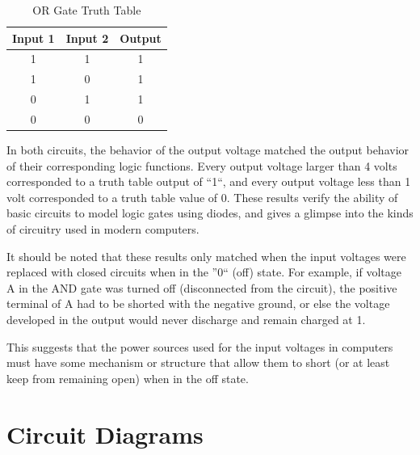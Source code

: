 \documentclass[twocolumn,english]{IEEEtran}
\begin{document}
\begin{table}[h]
\centering{}
\caption{OR Gate Truth Table}
\begin{tabular}{@{}ccc@{}}
\toprule
\textbf{Input 1} & \multicolumn{1}{l}{\textbf{Input 2}} & \multicolumn{1}{l}{\textbf{Output}} \\ \midrule
1                & 1                                    & 1                                   \\
1                & 0                                    & 1                                   \\
0                & 1                                    & 1                                   \\
0                & 0                                    & 0                                   \\ \bottomrule
\end{tabular}
\end{table}

In both circuits, the behavior of the output voltage matched the output behavior of their corresponding logic functions.
Every output voltage larger than 4 volts corresponded to a truth table output of ``1``, and every output voltage less than 1 volt corresponded to a truth table value of 0.
These results verify the ability of basic circuits to model logic gates using diodes, and gives a glimpse into the kinds of circuitry used in modern computers.

It should be noted that these results only matched when the input voltages were replaced with closed circuits when in the ''0`` (off) state.
For example, if voltage A in the AND gate was turned off (disconnected from the circuit), the positive terminal of A had to be shorted with the negative ground, or else the voltage developed in the output would never discharge and remain charged at 1.

This suggests that the power sources used for the input voltages in computers must have some mechanism or structure that allow them to short (or at least keep from remaining open) when in the off state.

\noindent\hrulefill

\appendices{}
\section{Circuit Diagrams}
\end{document}
